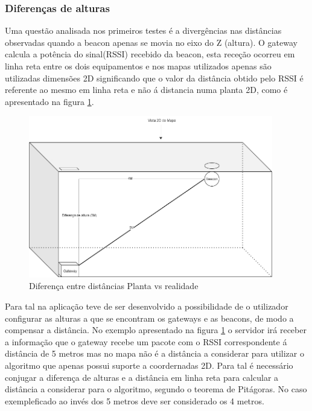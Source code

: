 \subsubsection{Diferenças de alturas}

\par Uma questão analisada nos primeiros testes é a divergências nas distâncias observadas quando a beacon apenas se movia no eixo do Z (altura). O gateway calcula a potência do sinal(RSSI) recebido da beacon, esta receção ocorreu em linha reta entre os dois equipamentos e nos mapas utilizados apenas são utilizadas dimensões 2D significando que o valor da distância obtido pelo RSSI é referente ao mesmo em linha reta e não á distancia numa planta 2D, como é apresentado na figura \ref{altura1}.

 \begin{figure}[ht]
\centering
\includegraphics[width=0.95\textwidth]{images/disr.png}
\caption{Diferença entre distâncias Planta vs realidade}\label{altura1}
\end{figure}


\par Para tal na aplicação teve de ser desenvolvido a possibilidade de o utilizador configurar as alturas a que se encontram os gateways e as beacons, de modo a compensar a distância. No exemplo apresentado na figura \ref{altura1} o servidor irá receber a informação que o gateway recebe um pacote com o RSSI correspondente á distância de 5 metros mas no mapa não é a distância a considerar para utilizar o algoritmo que apenas possui suporte a coordernadas 2D. Para tal é necessário conjugar a diferença de alturas e a distância em linha reta para calcular a distância a considerar para o algoritmo, segundo o teorema de Pitágoras. No caso exempleficado ao invés dos 5 metros deve ser considerado os 4 metros.

